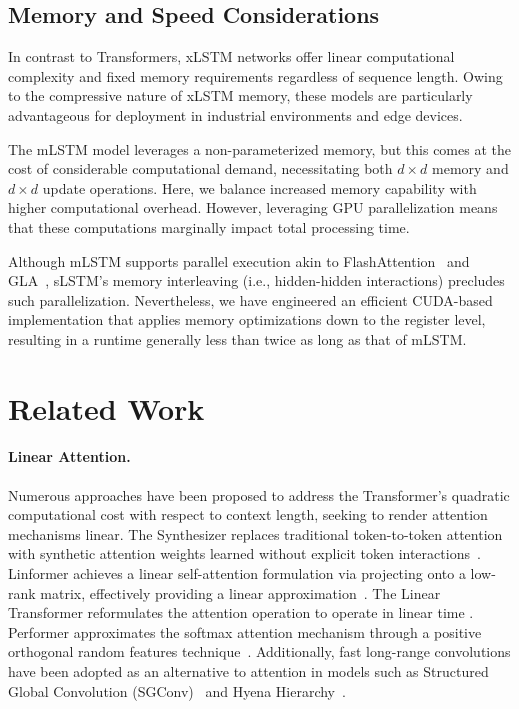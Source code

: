 \subsection{Memory and Speed Considerations}

In contrast to Transformers, xLSTM networks offer linear computational complexity and fixed memory requirements regardless of sequence length. Owing to the compressive nature of xLSTM memory, these models are particularly advantageous for deployment in industrial environments and edge devices.

The mLSTM model leverages a non-parameterized memory, but this comes at the cost of considerable computational demand, necessitating both $d \times d$ memory and $d \times d$ update operations. Here, we balance increased memory capability with higher computational overhead. However, leveraging GPU parallelization means that these computations marginally impact total processing time.

Although mLSTM supports parallel execution akin to FlashAttention~\citep{Dao:22,Dao:23} and GLA~\citep{Yang:23arxiv}, sLSTM’s memory interleaving (i.e., hidden-hidden interactions) precludes such parallelization. Nevertheless, we have engineered an efficient CUDA-based implementation that applies memory optimizations down to the register level, resulting in a runtime generally less than twice as long as that of mLSTM.

\section{Related Work}
\label{sec:related}

\paragraph{Linear Attention.} Numerous approaches have been proposed to address the Transformer’s quadratic computational cost with respect to context length, seeking to render attention mechanisms linear. The Synthesizer replaces traditional token-to-token attention with synthetic attention weights learned without explicit token interactions~\citep{Tay:20arxiv}. Linformer achieves a linear self-attention formulation via projecting onto a low-rank matrix, effectively providing a linear approximation~\citep{Wang:20arxiv}. The Linear Transformer reformulates the attention operation to operate in linear time \citep{Katharopoulos:20}. Performer approximates the softmax attention mechanism through a positive orthogonal random features technique~\citep{Choromanski:21}. Additionally, fast long-range convolutions have been adopted as an alternative to attention in models such as Structured Global Convolution (SGConv)~\citep{Li:22} and Hyena Hierarchy~\citep{Poli:23}.

